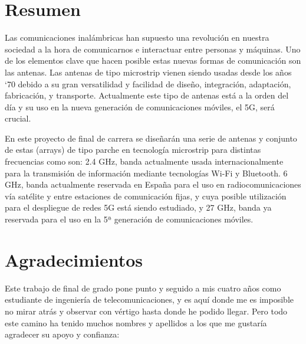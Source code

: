 
\chapter*{Resumen}
\thispagestyle{empty}
\par Las comunicaciones inalámbricas han supuesto una revolución en nuestra sociedad a la hora de comunicarnos e interactuar entre personas y máquinas. Uno de los elementos clave que hacen posible estas nuevas formas de comunicación son las antenas. Las antenas de tipo microstrip vienen siendo usadas desde los años ‘70 debido a su gran versatilidad y facilidad de diseño, integración, adaptación, fabricación, y transporte. Actualmente este tipo de antenas está a la orden del día y su uso en la nueva generación de comunicaciones móviles, el 5G, será crucial.
\\
\par En este proyecto de final de carrera se diseñarán una serie de antenas y conjunto de estas (arrays) de tipo parche en tecnología microstrip para distintas frecuencias como son: 2.4 GHz, banda actualmente usada internacionalmente para la transmisión de información mediante tecnologías Wi-Fi y Bluetooth.  6 GHz, banda actualmente reservada en España para el uso en radiocomunicaciones vía satélite y entre estaciones de comunicación fijas, y cuya posible utilización para el despliegue de redes 5G está siendo estudiado, y 27 GHz, banda ya reservada para el uso en la 5ª generación de comunicaciones móviles.





\cleardoublepage %
\chapter*{Agradecimientos}

\thispagestyle{empty}
\vspace{1cm}

\par Este trabajo de final de grado pone punto y seguido a mis cuatro años como estudiante de ingeniería de telecomunicaciones, y es aquí donde me es imposible no mirar atrás y observar con vértigo hasta donde he podido llegar.
Pero todo este camino ha tenido muchos nombres y apellidos a los que me gustaría agradecer su apoyo y confianza:


